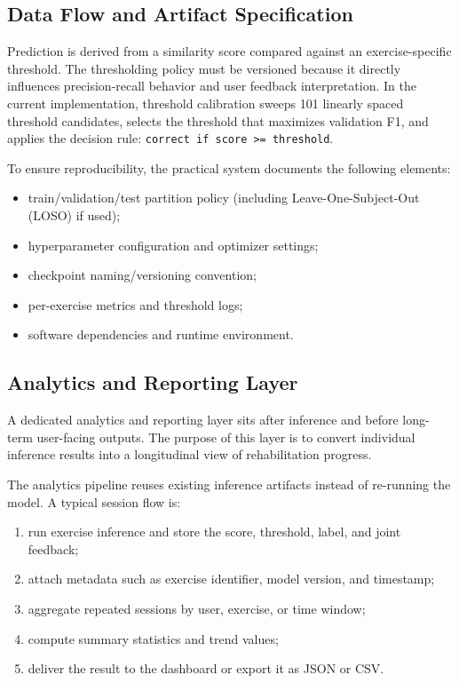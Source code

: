\subsection{Data Flow and Artifact Specification}
Prediction is derived from a similarity score compared against an exercise-specific threshold. The thresholding policy must be versioned because it directly influences precision-recall behavior and user feedback interpretation. In the current implementation, threshold calibration sweeps 101 linearly spaced threshold candidates, selects the threshold that maximizes validation F1, and applies the decision rule: \texttt{correct if score >= threshold}.

To ensure reproducibility, the practical system documents the following elements:
\begin{itemize}
    \item train/validation/test partition policy (including Leave-One-Subject-Out (LOSO) if used);
    \item hyperparameter configuration and optimizer settings;
    \item checkpoint naming/versioning convention;
    \item per-exercise metrics and threshold logs;
    \item software dependencies and runtime environment.
\end{itemize}

\subsection{Analytics and Reporting Layer}
A dedicated analytics and reporting layer sits after inference and before long-term user-facing outputs. The purpose of this layer is to convert individual inference results into a longitudinal view of rehabilitation progress.

The analytics pipeline reuses existing inference artifacts instead of re-running the model. A typical session flow is:
\begin{enumerate}
    \item run exercise inference and store the score, threshold, label, and joint feedback;
    \item attach metadata such as exercise identifier, model version, and timestamp;
    \item aggregate repeated sessions by user, exercise, or time window;
    \item compute summary statistics and trend values;
    \item deliver the result to the dashboard or export it as JSON or CSV.
\end{enumerate}

